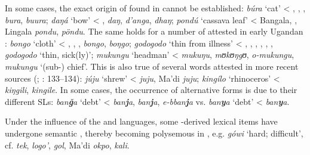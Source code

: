 \documentclass[output=paper]{langsci/langscibook}
\begin{document}
In some cases, the exact origin of  found in   cannot be established: \textit{búra} ‘cat’ < , , ,  \textit{bura},  \textit{buura}; \textit{daŋá} ‘bow’ < ,  \textit{daŋ},  \textit{d'anga},  \textit{dhaŋ}; \textit{pondú} ‘cassava leaf’ < Bangala, , Lingala \textit{pondu},  \textit{pöndu}. The same holds for a number of  attested in early Ugandan  \citep{Avram2017talk}: \textit{bongo} ‘cloth’ < , , ,  \textit{bongo},  \textit{boŋgo}; \textit{godogodo} ‘thin from illness’ < , , , , , ,  \textit{godogodo} ‘thin, sick(ly)’; \textit{mukungu} ‘headman’ <  \textit{mukuŋu},  \textit{mʊkʊ}\textit{ŋgʊ},  \textit{o-mukungu},  \textit{mukungu} ‘(sub-) chief’. This is also true of several  words attested in more recent sources (\citealt{Wellens2003}; \citealt{Nakao2012}: 133–134): \textit{júju} ‘shrew’ <  \textit{juju}, Ma'di \textit{juju}; \textit{kingílo} ‘rhinoceros’ <  \textit{kiŋgili},  \textit{kingile}. In some cases, the occurrence of alternative forms is due to their different SLs: \textit{ban\textbf{ǧ}a} ‘debt’ <  \textit{ban\textbf{j}a},  \textit{ban\textbf{j}a},  \textit{e-bban\textbf{j}a} vs. \textit{ban\textbf{y}a} ‘debt’ <  \textit{ban\textbf{y}a}. 

Under the influence of the  and  languages, some -derived lexical items have undergone semantic , thereby becoming polysemous in   \citep[136]{Nakao2012}, e.g. \textit{gówi} ‘hard; difficult’, cf.  \textit{tek},  \textit{logo’},  \textit{gol}, Ma'di \textit{okpo},  \textit{kali}.
\end{document}
